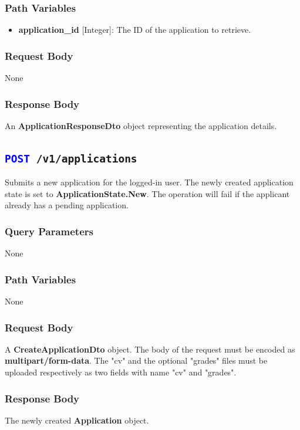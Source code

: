 \subsubsection{Path Variables}
\begin{itemize}
    \item \textbf{application\_id} [Integer]: The ID of the application to retrieve.
\end{itemize}

\subsubsection{Request Body}
None

\subsubsection{Response Body}
An \textbf{ApplicationResponseDto} object representing the application details.


\subsection{\texttt{\textcolor{blue}{POST} /v1/applications}}

Submits a new application for the logged-in user. 
The newly created application state is set to \textbf{ApplicationState.New}.
The operation will fail if the applicant already has a pending application.

\subsubsection{Query Parameters}
None

\subsubsection{Path Variables}
None

\subsubsection{Request Body}
A \textbf{CreateApplicationDto} object.
The body of the request must be encoded as \textbf{multipart/form-data}.
The "cv" and the optional "grades" files must be uploaded respectively as two fields with name "cv" and "grades".

\subsubsection{Response Body}
The newly created \textbf{Application} object.

